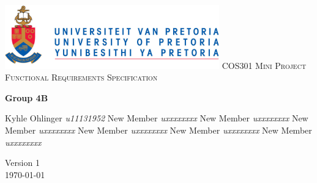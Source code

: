 \begin{titlepage}
\begin{center}
\includegraphics[width=350px]{University_of_Pretoria_Logo.png}\newline
\textsc{\LARGE COS301 Mini Project Functional Requirements Specification}\newline


\textbf{Group 4B} \\
\begin{flushright} \large
Kyhle Ohlinger \emph{u11131952} \newline
New Member \emph{uxxxxxxxx} \newline
New Member \emph{uxxxxxxxx} \newline
New Member \emph{uxxxxxxxx} \newline
New Member \emph{uxxxxxxxx} \newline
New Member \emph{uxxxxxxxx} \newline
New Member \emph{uxxxxxxxx} \newline
\end{flushright}

\vfill

{\large Version 1}
\\
{\large \today}

\end{center}
\end{titlepage}
